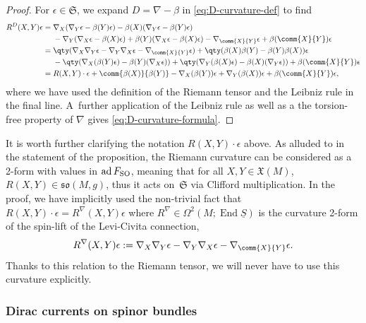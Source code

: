 \documentclass[pdftex]{sigma}
\numberwithin{equation}{section}
\newcommand{\fso}{\mathfrak{so}}
\newcommand{\fX}{\mathfrak{X}}
\newcommand{\fS}{\mathfrak{S}}
\newcommand{\Sbundle}{\underline{S}}
\newcommand{\1}{\mathbbm{1}}
\DeclareMathOperator{\End}{End}
\DeclareMathOperator{\ad}{ad}
\begin{document}
\begin{proof}
	For $\epsilon\in\fS$, we expand $D=\nabla-\beta$ in \eqref{eq:D-curvature-def} to find
	\begin{align*}
		 R^D(X,Y)\epsilon	
			={}& \nabla_X(\nabla_Y\epsilon-\beta(Y)\epsilon) - \beta(X)(\nabla_Y\epsilon-\beta(Y)\epsilon)	\\
				& - \nabla_Y(\nabla_X\epsilon-\beta(X)\epsilon) + \beta(Y)(\nabla_X\epsilon-\beta(X)\epsilon)
				- \nabla_{\comm{X}{Y}}\epsilon + \beta({\comm{X}{Y}})\epsilon	\\
			={}& \qty(\nabla_X\nabla_Y\epsilon - \nabla_Y\nabla_X\epsilon - \nabla_{\comm{X}{Y}}\epsilon)
				+ \qty(\beta(X)\beta(Y)-\beta(Y)\beta(X))\epsilon	\\
				& - \qty(\nabla_X(\beta(Y)\epsilon)-\beta(Y)(\nabla_X\epsilon)) + \qty(\nabla_Y(\beta(X)\epsilon)
				- \beta(X)(\nabla_Y\epsilon)) + \beta({\comm{X}{Y}})\epsilon \\
			={}& R(X,Y)\cdot\epsilon + \comm{\beta(X)}{\beta(Y)} - \nabla_X(\beta(Y))\epsilon + \nabla_Y(\beta(X))\epsilon + \beta({\comm{X}{Y}})\epsilon,
	\end{align*}
	where we have used the definition of the Riemann tensor and the Leibniz rule in the final line. A~further application of the Leibniz rule as well as a the torsion-free property of $\nabla$ gives \eqref{eq:D-curvature-formula}.
\end{proof}

\begin{Remark}\label{rem:riemann-spinor-action}
	It is worth further clarifying the notation $R(X,Y)\cdot\epsilon$ above. As alluded to in the statement of the proposition, the Riemann curvature can be considered as a 2-form with values in $\ad F_{\rm SO}$, meaning that for all $X,Y\in \fX(M)$, $R(X,Y)\in\fso(M,g)$, thus it acts on~$\fS$ via Clifford multiplication. In the proof, we have implicitly used the non-trivial fact that~${R(X,Y)\cdot\epsilon=R^\nabla(X,Y)\epsilon}$ where $R^\nabla\in\Omega^2(M;\End \Sbundle)$ is the curvature 2-form of the spin-lift of the Levi-Civita connection,
\[
R^\nabla(X,Y)\epsilon:=\nabla_X\nabla_Y\epsilon-\nabla_Y\nabla_X\epsilon-\nabla_{\comm{X}{Y}}\epsilon.
\]
Thanks to this relation to the Riemann tensor, we will never have to use this curvature explicitly.
\end{Remark}

\subsubsection{Dirac currents on spinor bundles}
\label{sec:dirac-current-bundle}
\end{document}
